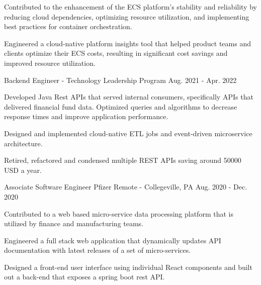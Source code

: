 \begin{cventries}
{\begin{cvitems}
        \item {Contributed to the enhancement of the ECS platform's stability and reliability by reducing cloud dependencies, optimizing resource utilization, and implementing best practices for container orchestration.}
        \item {Engineered a cloud-native platform insights tool that helped product teams and clients optimize their ECS costs, resulting in significant cost savings and improved resource utilization.}
      \end{cvitems}
    }
  \cventry
    {Backend Engineer - Technology Leadership Program} %
    {} %
    {} %
    {Aug. 2021 - Apr. 2022} %
    {
      \begin{cvitems} %
        \item {Developed Java Rest APIs that served internal consumers, specifically APIs that delivered financial fund data. Optimized queries and algorithms to decrease response times and improve application performance.}
        \item {Designed and implemented cloud-native ETL jobs and event-driven microservice architecture.}
        \item {Retired, refactored and condensed multiple REST APIs saving around 50000 USD a year.}
      \end{cvitems}
    }


  \cventry
    {Associate Software Engineer} %
    {Pfizer} %
    {Remote - Collegeville, PA} %
    {Aug. 2020 - Dec. 2020} %
    {
      \begin{cvitems} %
        \item {Contributed to a web based micro-service data processing platform that is utilized by finance and manufacturing teams.}
        \item {Engineered a full stack web application that dynamically updates API documentation with latest releases of a set of micro-services.}
        \item {Designed a front-end user interface using individual React components and built out a back-end that exposes a spring boot rest API.}
      \end{cvitems}
    }

\end{cventries}
